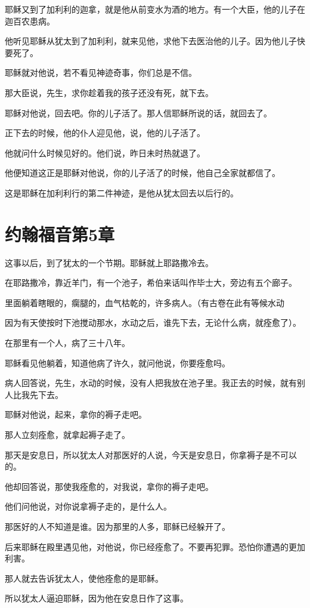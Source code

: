 \documentclass[12pt,oneside]{book}
\begin{document}
耶稣又到了加利利的迦拿，就是他从前变水为酒的地方。有一个大臣，他的儿子在迦百农患病。

他听见耶稣从犹太到了加利利，就来见他，求他下去医治他的儿子。因为他儿子快要死了。

耶稣就对他说，若不看见神迹奇事，你们总是不信。

那大臣说，先生，求你趁着我的孩子还没有死，就下去。

耶稣对他说，回去吧。你的儿子活了。那人信耶稣所说的话，就回去了。

正下去的时候，他的仆人迎见他，说，他的儿子活了。

他就问什么时候见好的。他们说，昨日未时热就退了。

他便知道这正是耶稣对他说，你的儿子活了的时候，他自己全家就都信了。

这是耶稣在加利利行的第二件神迹，是他从犹太回去以后行的。

\chapter{约翰福音第5章}
这事以后，到了犹太的一个节期。耶稣就上耶路撒冷去。

在耶路撒冷，靠近羊门，有一个池子，希伯来话叫作毕士大，旁边有五个廊子。

里面躺着瞎眼的，瘸腿的，血气枯乾的，许多病人。（有古卷在此有等候水动

因为有天使按时下池搅动那水，水动之后，谁先下去，无论什么病，就痊愈了）。

在那里有一个人，病了三十八年。

耶稣看见他躺着，知道他病了许久，就问他说，你要痊愈吗。

病人回答说，先生，水动的时候，没有人把我放在池子里。我正去的时候，就有别人比我先下去。

耶稣对他说，起来，拿你的褥子走吧。

那人立刻痊愈，就拿起褥子走了。

那天是安息日，所以犹太人对那医好的人说，今天是安息日，你拿褥子是不可以的。

他却回答说，那使我痊愈的，对我说，拿你的褥子走吧。

他们问他说，对你说拿褥子走的，是什么人。

那医好的人不知道是谁。因为那里的人多，耶稣已经躲开了。

后来耶稣在殿里遇见他，对他说，你已经痊愈了。不要再犯罪。恐怕你遭遇的更加利害。

那人就去告诉犹太人，使他痊愈的是耶稣。

所以犹太人逼迫耶稣，因为他在安息日作了这事。
\end{document}
